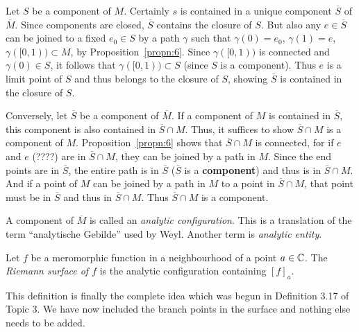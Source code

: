 \documentclass[a4paper,11pt]{article}
\begin{document}
\begin{myproof}
  Let $S$ be a component of $M$.  Certainly $s$ is contained in a
  unique component $\overline{S}$ of $\overline{M}$.  Since components
  are closed, $\overline{S}$ contains the closure of $S$.  But also
  any $e \in \overline{S}$ can be joined to a fixed $e_0 \in S$ by a
  path $\gamma$ such that $\gamma(0) = e_0$, $\gamma(1) = e$,
  $\gamma([0,1)) \subset M$, by Proposition~\ref{propn:6}.  Since
  $\gamma([0,1))$ is connected and $\gamma(0) \in S$, it follows that
  $\gamma([0,1)) \subset S$ (since $S$ is a component).  Thus $e$ is a
  limit point of $S$ and thus belongs to the closure of $S$, showing
  $\overline{S}$ is contained in the closure of $S$.

  Conversely, let $\overline{S}$ be a component of $\overline{M}$.  If
  a component of $M$ is contained in $\overline{S}$, this component is
  also contained in $\overline{S} \cap M$.  Thus, it suffices to show 
  $\overline{S} \cap M$ is a component of $M$.
  Proposition~\ref{propn:6} shows that $\overline{S} \cap M$ is
  connected, for if $e$ and $e$ (????) are in $\overline{S} \cap M$,
  they can be joined by a path in $M$.  Since the end points are in
  $\overline{S}$, the entire path is in $\overline{S}$ ($\overline{S}$
  is a \textbf{component}) and thus is in $\overline{S} \cap M$.  And
  if a point of $M$ can be joined by a path in $M$ to a point in
  $\overline{S} \cap M$, that point must be in $\overline{S}$ and thus
  in $\overline{S} \cap M$.  Thus $\overline{S} \cap M$ is a component.
\end{myproof}

\begin{defn}
  \label{def:7}
  A component of $\overline{M}$ is called an \emph{analytic
    configuration}.  This is a translation of the term ``analytische
  Gebilde'' used by Weyl.  Another term is \emph{analytic entity}.
\end{defn}

\begin{defn}
  \label{def:8}
  Let $f$ be a meromorphic function in a neighbourhood of a point $a
  \in {\mathbb C}$.  The \emph{Riemann surface of $f$} is the analytic
  configuration containing $[f]_a$.
\end{defn}

This definition is finally the complete idea which was begun in
Definition 3.17 of Topic 3.  We have now included the branch points in
the surface and nothing else needs to be added.
\end{document}
